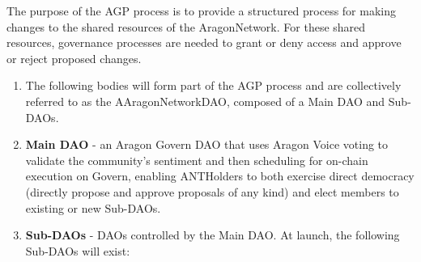 
\label{chap:AGPProcess}

The purpose of the \acf{AGP} process is to provide a structured process for making changes to the shared resources of the \gls{AragonNetwork}. For these shared resources, governance processes are needed to grant or deny access and approve or reject proposed changes.

\begin{enumerate}
	\begin{enumerate}
		\item The following bodies will form part of the \ac{AGP} process and are collectively referred to as the A\gls{AragonNetworkDAO}, composed of a Main \ac{DAO} and Sub-\acp{DAO}.
		\item \textbf{Main \ac{DAO}} - an Aragon Govern \ac{DAO} that uses Aragon Voice voting to validate the community’s sentiment and then scheduling for on-chain execution on Govern, enabling \glspl{ANTHolder} to both exercise direct democracy (directly propose and approve proposals of any kind) and elect members to existing or new Sub-\acp{DAO}.
		\item \textbf{Sub-\acp{DAO}} - \acp{DAO} controlled by the Main \ac{DAO}. At launch, the following Sub-\acp{DAO} will exist:
		

\end{enumerate}
\end{enumerate}
